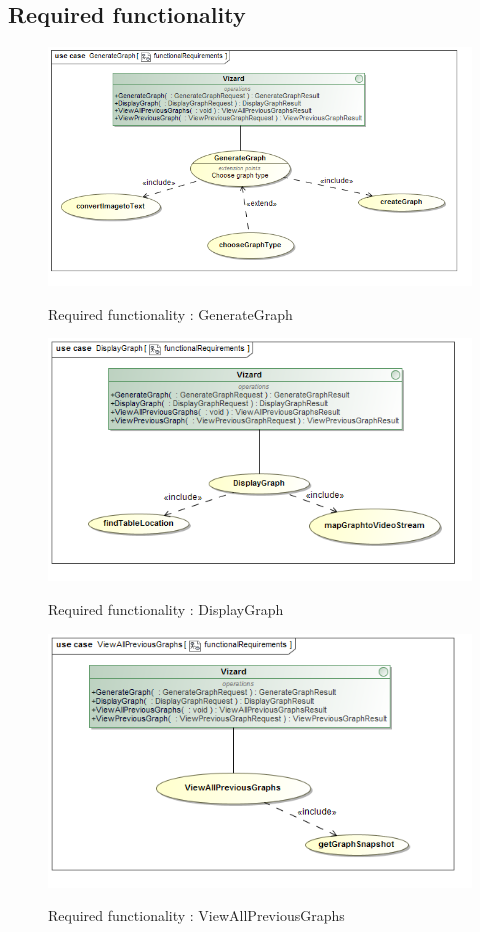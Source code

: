 \documentclass[a4paper,12pt]{article}
\begin{document}
\subsection{Required functionality}
	\begin{figure}[H]
		\includegraphics[width=\textwidth]{Images/uc__GenerateGraph__functionalRequirements.png}  \\
		\caption{Required functionality : GenerateGraph}
	\end{figure}
	\begin{figure}[H]
		\includegraphics[width=\textwidth]{Images/uc__DisplayGraph__functionalRequirements.png}  \\
		\caption{Required functionality : DisplayGraph}
	\end{figure}
	\begin{figure}[H]
		\includegraphics[width=\textwidth]{Images/uc__ViewAllPreviousGraphs__functionalRequirements.png}  \\
		\caption{Required functionality : ViewAllPreviousGraphs}
	\end{figure}
\end{document}
